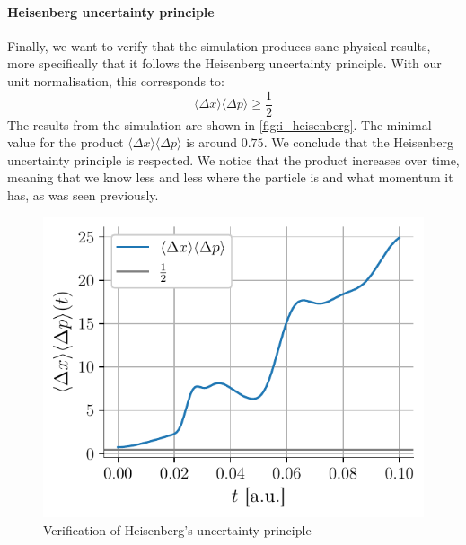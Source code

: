 \paragraph{Heisenberg uncertainty principle} Finally, we want to verify that the simulation produces sane physical results, more specifically that it follows the Heisenberg uncertainty principle. With our unit normalisation, this corresponds to:
\begin{equation}
    \langle \Delta x \rangle \langle \Delta p \rangle \ge \frac{1}{2}
\end{equation}
The results from the simulation are shown in \autoref{fig:i_heisenberg}. The minimal value for the product \(\langle \Delta x \rangle \langle \Delta p \rangle\) is around \(0.75\). We conclude that the Heisenberg uncertainty principle is respected. We notice that the product increases over time, meaning that we know less and less where the particle is and what momentum it has, as was seen previously.

\begin{figure}[h]
    \centering
    \includegraphics[width=0.6\linewidth]{figures/i_heisenberg.pdf}
    \caption{Verification of Heisenberg's uncertainty principle}
    \label{fig:i_heisenberg}
\end{figure}

